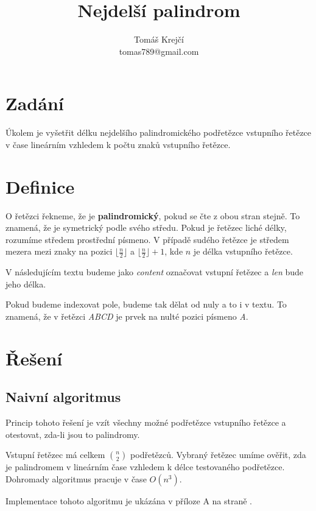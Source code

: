 \documentclass[12pt,a4paper]{article}
\author{Tomáš Krejčí \\
tomas789@gmail.com}
\title{Nejdelší palindrom}
\begin{document}
\maketitle

\section{Zadání}

Úkolem je vyšetřit délku nejdelšího palindromického podřetězce vstupního řetězce v čase lineárním vzhledem k počtu znaků vstupního řetězce.

\section{Definice}

O řetězci řekneme, že je \textbf{palindromický}, pokud se čte z obou stran stejně. To znamená, že je symetrický podle svého středu. Pokud je řetězec liché délky, rozumíme středem prostřední písmeno. V případě sudého řetězce je středem mezera mezi znaky na pozici $\lfloor \frac{n}{2} \rfloor$ a $\lfloor \frac{n}{2} \rfloor + 1$, kde $n$ je délka vstupního řetězce.

V následujícím textu budeme jako \emph{content} označovat vstupní řetězec a \emph{len} bude jeho délka.

Pokud budeme indexovat pole, budeme tak dělat od nuly a to i v textu. To znamená, že v řetězci \textit{ABCD} je prvek na nulté pozici písmeno \textit{A}.

\section{Řešení}

\subsection{Naivní algoritmus}

\label{naivni}

Princip tohoto řešení je vzít všechny možné podřetězce vstupního řetězce a otestovat, zda-li jsou to palindromy.

Vstupní řetězec má celkem ${n \choose 2}$ podřetězců. Vybraný řetězec umíme ověřit, zda je palindromem v lineárním čase vzhledem k délce testovaného podřetězce. Dohromady algoritmus pracuje v čase $O(n^3)$.

Implementace tohoto algoritmu je ukázána v příloze A na straně \pageref{prilohaA}.
\end{document}
